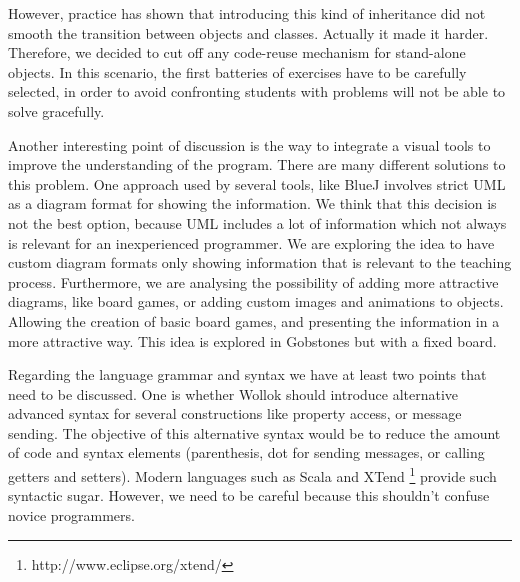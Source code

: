 However, practice has shown that introducing this kind of inheritance did not smooth the transition between objects and classes. Actually it made it harder.
Therefore, we decided to cut off any code-reuse mechanism for stand-alone objects.
In this scenario, the first batteries of exercises have to be carefully selected, 
in order to avoid confronting students with problems will not be able to solve gracefully.

\medskip 
Another interesting point of discussion is the way to integrate a visual tools to improve the understanding of the program. 
There are many different solutions to this problem. 
One approach used by several tools, like BlueJ \cite{bennedsen_bluej_2010} involves strict UML as a diagram format for showing the information.
We think that this decision is not the best option, because UML includes a lot of information which not always is relevant for an inexperienced programmer. 
We are exploring the idea to have custom diagram formats only showing information that is relevant to the teaching process. 
Furthermore, we are analysing the possibility of adding more attractive diagrams, like board games, or adding custom images and animations to objects.
Allowing the creation of basic board games, and presenting the information in a more attractive way. 
This idea is explored in Gobstones \cite{lopez_nombre_2012} but with a fixed board.

\medskip
Regarding the language grammar and syntax we have at least two points that need to be discussed. 
One is whether Wollok should introduce alternative
advanced syntax for several constructions like property access, or message
sending. The objective of this alternative syntax would be to reduce the amount
of code and syntax elements (\eg parenthesis, dot for sending messages, or calling getters and
setters). Modern languages such as Scala\cite{Oder04a} and
XTend \footnote{http://www.eclipse.org/xtend/} provide such syntactic sugar.
However, we need to be careful because this shouldn't confuse novice programmers.

